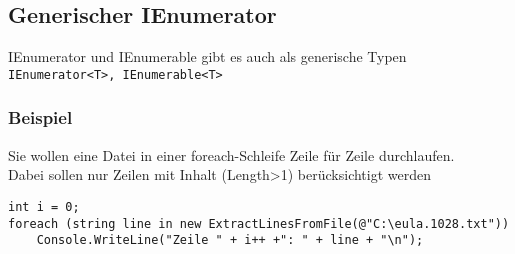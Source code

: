 \subsection{Generischer IEnumerator}
IEnumerator und IEnumerable gibt es auch als generische Typen \lstinline`IEnumerator<T>, IEnumerable<T>`

\subsubsection*{Beispiel}
Sie wollen eine Datei in einer foreach-Schleife Zeile für Zeile durchlaufen.\\
Dabei sollen nur Zeilen mit Inhalt (Length>1) berücksichtigt werden
\begin{lstlisting}[language={[Sharp]C}]
int i = 0; 
foreach (string line in new ExtractLinesFromFile(@"C:\eula.1028.txt"))
	Console.WriteLine("Zeile " + i++ +": " + line + "\n"); 
\end{lstlisting}
